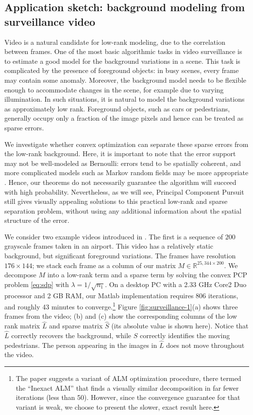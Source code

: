 \subsection{Application sketch: background modeling from surveillance video} Video is a natural candidate for low-rank modeling, due to the correlation between frames. One of the most basic algorithmic tasks in video surveillance is to estimate a good model for the background variations in a scene. This task is complicated by the presence of foreground objects: in busy scenes, every frame may contain some anomaly. Moreover, the background model needs to be flexible enough to accommodate changes in the scene, for example due to varying illumination. In such situations, it is natural to model the background variations as approximately low rank. Foreground objects, such as cars or pedestrians, generally occupy only a fraction of the image pixels and hence can be treated as sparse errors.

We investigate whether convex optimization can separate these sparse errors from the low-rank background. Here, it is important to note that the error support may not be well-modeled as Bernoulli: errors tend to be spatially coherent, and more complicated models such as Markov random fields may be more appropriate \cite{Cevher2008-ECCV,Zhou2009-ICCV}. Hence, our theorems do not necessarily guarantee the algorithm will succeed with high probability. Nevertheless, as we will see, Principal Component Pursuit\, still gives visually appealing solutions to this practical low-rank and sparse separation problem, without using any additional information about the spatial structure of the error.

We consider two example videos introduced in \cite{Li2004-TIP}. The first is a sequence of $200$ grayscale frames taken in an airport. This video has a relatively static background, but significant foreground variations. The frames have resolution $176
\times 144$; we stack each frame as a column of our matrix $M \in
\mathbb{R}^{25,344 \times 200}$. We decompose $M$ into a low-rank term and a sparse term by solving the convex PCP problem \eqref{eq:sdp}
with $\lambda = 1/\sqrt{n_{1}}$. On a desktop PC with a 2.33 GHz Core2 Duo processor and 2 GB RAM, our Matlab implementation requires 806 iterations, and roughly 43 minutes to converge.\footnote{The paper \cite{Lin2009-ALM} suggests a variant of ALM optimization procedure, there termed the ``Inexact ALM'' that finds a visually similar decomposition in far fewer iterations (less than 50). However, since the convergence guarantee for that variant is weak, we choose to present the slower, exact result here.} Figure
\ref{fig:surveillance-1}(a) shows three frames from the video; (b) and (c) show the corresponding columns of the low rank matrix $\hat L$ and sparse matrix $\hat S$ (its absolute value is shown here). Notice that
$\hat L$ correctly recovers the background, while $\hat S$ correctly identifies the moving pedestrians. The person appearing in the images in $\hat L$ does not move throughout the video.


